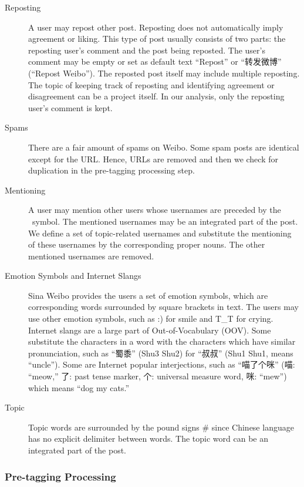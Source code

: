 \documentclass[11pt]{article}
\newcommand{\1}[1]{{\mathbf 1}\left\{#1\right\}}        %
\begin{document}
\begin{description}
\item[Reposting] A user may repost other post. Reposting does not automatically imply agreement or liking. This type of post usually consists of two parts: the reposting user's comment and the post being reposted. The user's comment may be empty or set as default text ``Repost'' or ``转发微博'' (``Repost Weibo''). The reposted post itself may include multiple reposting. The topic of keeping track of reposting and identifying agreement or disagreement can be a project itself. In our analysis, only the reposting user's comment is kept.  

\item[Spams] There are a fair amount of spams on Weibo. Some spam posts are identical except for the URL. Hence, URLs are removed and then we check for duplication in the pre-tagging processing step.

\item[Mentioning] A user may mention other users whose usernames are preceded by the \MVAt\  symbol. The mentioned usernames may be an integrated part of the post. We define a set of topic-related usernames and substitute the mentioning of these usernames by the corresponding proper nouns. The other mentioned usernames are removed.

\item[Emotion Symbols and Internet Slangs] Sina Weibo provides the users a set of emotion symbols, which are corresponding words surrounded by square brackets in text. The users may use other emotion symbols, such as {\ttfamily :)} for smile and {\ttfamily T\_T} for crying. Internet slangs are a large part of Out-of-Vocabulary (OOV). Some substitute the characters in a word with the characters which have similar pronunciation, such as ``蜀黍'' (Shu3 Shu2) for ``叔叔'' (Shu1 Shu1, means ``uncle''). Some are Internet popular interjections, such as ``喵了个咪'' (喵: ``meow,'' 了: past tense marker, 个: universal measure word, 咪: ``mew'') which means ``dog my cats.'' 

\item[Topic] Topic words are surrounded by the pound signs {\ttfamily \#} since Chinese language has no explicit delimiter between words. The topic word can be an integrated part of the post. 

\end{description}



\subsubsection{Pre-tagging Processing}
\end{document}
